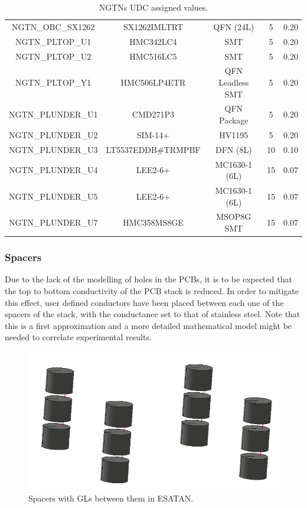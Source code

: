 \begin{table}[H]
\begin{tabular}{@{}ccccc@{}}
    NGTN\_OBC\_SX1262    & SX1262IMLTRT       & QFN (24L)        & 5                            & 0.20             \\
    NGTN\_PLTOP\_U1      & HMC342LC4          & SMT              & 5                            & 0.20             \\
    NGTN\_PLTOP\_U2      & HMC516LC5          & SMT              & 5                            & 0.20             \\
    NGTN\_PLTOP\_Y1      & HMC506LP4ETR       & QFN Leadless SMT & 5                            & 0.20             \\
    NGTN\_PLUNDER\_U1    & CMD271P3           & QFN Package      & 5                            & 0.20             \\
    NGTN\_PLUNDER\_U2    & SIM-14+            & HV1195           & 5                            & 0.20             \\
    NGTN\_PLUNDER\_U3    & LT5537EDDB\#TRMPBF & DFN (8L)         & 10                           & 0.10             \\
    NGTN\_PLUNDER\_U4    & LEE2-6+            & MC1630-1 (6L)    & 15                           & 0.07             \\
    NGTN\_PLUNDER\_U5    & LEE2-6+            & MC1630-1 (6L)    & 15                           & 0.07             \\
    NGTN\_PLUNDER\_U7    & HMC358MS8GE        & MSOP8G SMT       & 15                           & 0.07             \\ \bottomrule
    \end{tabular}
    \caption{NGTNs UDC assigned values.}
\end{table}

\subsubsection{Spacers}

Due to the lack of the modelling of holes in the PCBs, it is to be expected that the top to bottom conductivity
of the PCB stack is reduced. In order to mitigate this effect, user defined conductors have been placed between each one
of the spacers of the stack, with the conductance set to that of stainless steel. Note that this is a first approximation
and a more detailed mathematical model might be needed to correlate experimental results.

\begin{figure}[H]
    \centering
    \includegraphics[width=0.5\linewidth]{res/img/5_2_udcs/spacersudcs.PNG}
    \caption{Spacers with GLs between them in ESATAN.}
    \label{fig:spacersudcs}
\end{figure}

